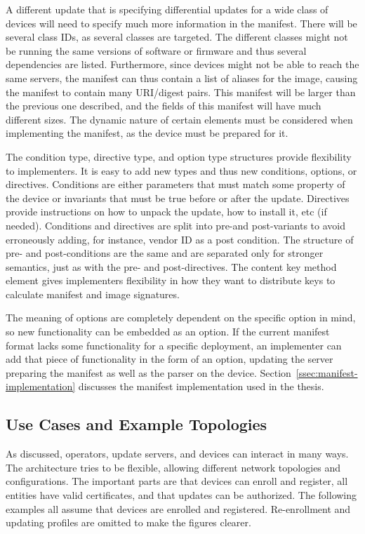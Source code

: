 \documentclass[0-thesis.tex]{subfiles}
\begin{document}
A different update that is specifying differential updates for a wide class of devices
will need to specify much more information in the manifest. There will be several class
IDs, as several classes are targeted. The different classes might not be running the same
versions of software or firmware and thus several dependencies are listed. Furthermore,
since devices might not be able to reach the same servers, the manifest can thus contain a
list of aliases for the image, causing the manifest to contain many URI/digest pairs. This
manifest will be larger than the previous one described, and the fields of this manifest
will have much different sizes. The dynamic nature of certain elements must be considered
when implementing the manifest, as the device must be prepared for it. 

The condition type, directive type, and option type structures provide flexibility to
implementers. It is easy to add new types and thus new conditions, options, or directives.
Conditions are either parameters that must match some property of the device or invariants
that must be true before or after the update. Directives provide instructions on how to
unpack the update, how to install it, etc (if needed). Conditions and directives are split
into pre-and post-variants to avoid erroneously adding, for instance, vendor ID as a post
condition. The structure of pre- and post-conditions are the same and are separated only
for stronger semantics, just as with the pre- and post-directives. The content key method
element gives implementers flexibility in how they want to distribute keys to calculate
manifest and image signatures.

The meaning of options are completely dependent on the specific option in mind, so new
functionality can be embedded as an option. If the current manifest format lacks some
functionality for a specific deployment, an implementer can add that piece of
functionality in the form of an option, updating the server preparing the manifest as well
as the parser on the device. Section~\ref{ssec:manifest-implementation} discusses the
manifest implementation used in the thesis.

\subsection{Use Cases and Example Topologies}
\label{ssec:use-cases-examples-topologies}
As discussed, operators, update servers, and devices can interact in many ways. The
architecture tries to be flexible, allowing different network topologies and
configurations. The important parts are that devices can enroll and register, all entities
have valid certificates, and that updates can be authorized. The following examples all
assume that devices are enrolled and registered. Re-enrollment and updating profiles
are omitted to make the figures clearer.
\end{document}
